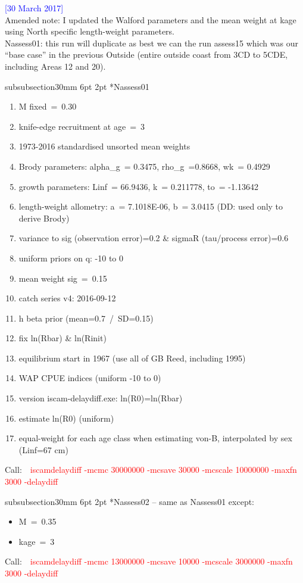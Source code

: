 \documentclass[11pt]{book}
\makeatletter
\newcommand{\red}[1]{{\textcolor{red} {#1}}}
\newcommand{\blue}[1]{{\textcolor{blue} {#1}}}
\renewcommand{\subsubsection}{\@startsection%
{subsubsection}{3}{0mm}%
{6pt \@plus -0pt \@minus -0pt}{2pt \@plus 0pt}%
{\normalfont\bf}}%
\newcommand\call[1]{
\footnotesize\selectfont\hangindent=0.35in
Call:~~\red{#1}
\normalsize\selectfont}
\makeatother
\begin{document}
\blue{[30 March 2017]}\\
Amended note: I updated the Walford parameters and the mean weight at kage using North specific length-weight parameters.\\[6pt]

Nassess01: this run will duplicate as best we can the run assess15 which was our ``base case'' in the previous Outside (entire outside coast from 3CD to 5CDE, including Areas 12 and 20).

\subsubsection*{Nassess01}
\begin{enumerate}[nosep]
  \item M fixed~=~0.30
  \item knife-edge recruitment at age~=~3
  \item 1973-2016 standardised unsorted mean weights
  \item Brody parameters: alpha\_g~= 0.3475, rho\_g~=0.8668, wk~= 0.4929
  \item growth parameters: Linf~= 66.9436, k~= 0.211778, to~= -1.13642
  \item length-weight allometry: a~= 7.1018E-06, b~= 3.0415 (DD: used only to derive Brody)
  \item variance to sig (observation error)=0.2 \& sigmaR (tau/process error)=0.6
  \item uniform priors on q: -10 to 0
  \item mean weight sig~=~0.15
  \item catch series v4: 2016-09-12
  \item h beta prior (mean=0.7~/~SD=0.15)
  \item fix ln(Rbar) \& ln(Rinit)
  \item equilibrium start in 1967 (use all of GB Reed, including 1995)
  \item WAP CPUE indices (uniform -10 to 0)
  \item version iscam-delaydiff.exe: ln(R0)=ln(Rbar)
  \item estimate ln(R0) (uniform)
  \item equal-weight for each age class when estimating von-B, interpolated by sex (Linf=67 cm)
\end{enumerate}
\call{iscamdelaydiff -mcmc 30000000 -mcsave 30000 -mcscale 10000000 -maxfn 3000 -delaydiff}

\subsubsection*{Nassess02 -- same as Nassess01 except:}
\begin{itemize}[nosep]
  \item M~=~0.35
  \item kage~=~3
\end{itemize}
\call{iscamdelaydiff -mcmc 13000000 -mcsave 10000 -mcscale 3000000 -maxfn 3000 -delaydiff}
\end{document}
